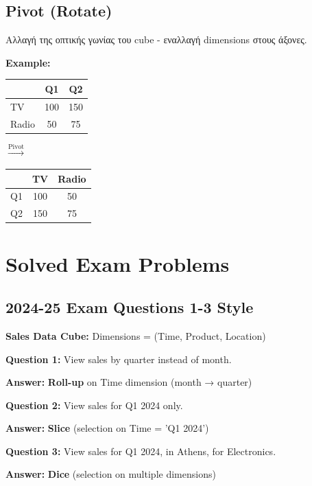 \subsection{Pivot (Rotate)}

\begin{definitionbox}[Pivot]
Αλλαγή της οπτικής γωνίας του cube - εναλλαγή dimensions στους άξονες.

\textbf{Example:}
\begin{center}
\begin{tabular}{l|cc}
& Q1 & Q2 \\
\hline
TV & 100 & 150 \\
Radio & 50 & 75 \\
\end{tabular}
$\xrightarrow{\text{Pivot}}$
\begin{tabular}{l|cc}
& TV & Radio \\
\hline
Q1 & 100 & 50 \\
Q2 & 150 & 75 \\
\end{tabular}
\end{center}
\end{definitionbox}

\section{Solved Exam Problems}

\subsection{2024-25 Exam Questions 1-3 Style}

\begin{examplebox}
\textbf{Sales Data Cube:} Dimensions = (Time, Product, Location)

\textbf{Question 1:} View sales by quarter instead of month.

\textbf{Answer:} \textbf{Roll-up} on Time dimension (month → quarter)

\textbf{Question 2:} View sales for Q1 2024 only.

\textbf{Answer:} \textbf{Slice} (selection on Time = 'Q1 2024')

\textbf{Question 3:} View sales for Q1 2024, in Athens, for Electronics.

\textbf{Answer:} \textbf{Dice} (selection on multiple dimensions)
\end{examplebox}

